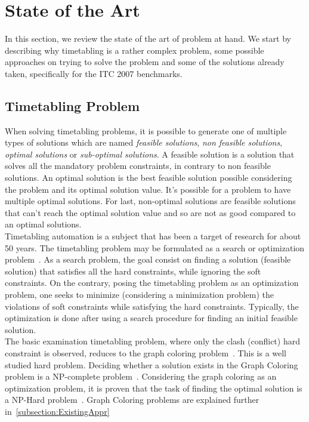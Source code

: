 \chapter{State of the Art}
\label{theory}
\thispagestyle{plain}

In this section, we review the state of the art of problem at hand. We start by describing why timetabling is a rather complex problem, some possible approaches on trying to solve the problem and some of the solutions already taken, specifically for the ITC 2007 benchmarks.
\\

\section{Timetabling Problem}

When solving timetabling problems, it is possible to generate one of multiple types of solutions which are named \textit{feasible solutions}, \textit{non feasible solutions}, \textit{optimal solutions} or \textit{sub-optimal solutions}. A feasible solution is a solution that solves all the mandatory problem constraints, in contrary to non feasible solutions. An optimal solution is the best feasible solution possible considering the problem and its optimal solution value. It's possible for a problem to have multiple optimal solutions. For last, non-optimal solutions are feasible solutions that can't reach the optimal solution value and so are not as good compared to an optimal solutions.\\

Timetabling automation is a subject that has been a target of research for about 50 years. The timetabling problem may be formulated as a search or optimization problem~\cite{Schaerf1999}. As a search problem, the goal consist on finding a solution (feasible solution) that satisfies all the hard constraints, while ignoring the soft constraints. On the contrary, posing the timetabling problem as an optimization problem, one seeks to minimize (considering a minimization problem) the violations of soft constraints while satisfying the hard constraints. Typically, the optimization is done after using a search procedure for finding an initial feasible solution.\\

The basic examination timetabling problem, where only the clash (conflict) hard constraint is observed, reduces to the graph coloring problem~\cite{Jensen2001}. This is a well studied hard problem. Deciding whether a solution exists in the Graph Coloring problem is a NP-complete problem~\cite{Arora2009}. Considering the graph coloring as an optimization problem, it is proven that the task of finding the optimal solution is a NP-Hard problem~\cite{Arora2009}. Graph Coloring problems are explained further in~\ref{subsection:ExistingAppr}
\\
